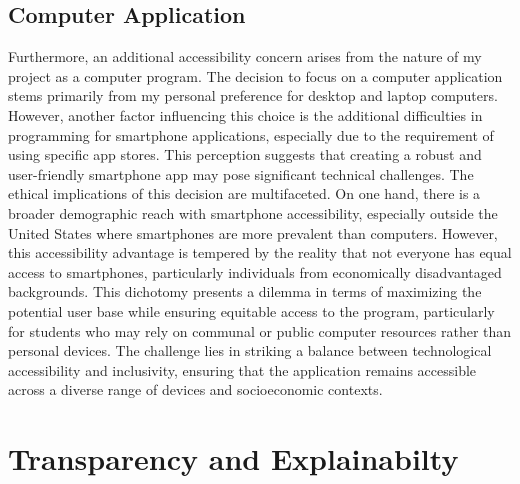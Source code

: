 \documentclass[10pt,twocolumn]{article}
\begin{document}
\subsection{Computer Application}
Furthermore, an additional accessibility concern arises from the nature of my project as a computer program. The decision to focus on a computer application stems primarily from my personal preference for desktop and laptop computers. However, another factor influencing this choice is the additional difficulties in programming for smartphone applications, especially due to the requirement of using specific app stores. This perception suggests that creating a robust and user-friendly smartphone app may pose significant technical challenges. The ethical implications of this decision are multifaceted. On one hand, there is a broader demographic reach with smartphone accessibility, especially outside the United States where smartphones are more prevalent than computers. However, this accessibility advantage is tempered by the reality that not everyone has equal access to smartphones, particularly individuals from economically disadvantaged backgrounds. This dichotomy presents a dilemma in terms of maximizing the potential user base while ensuring equitable access to the program, particularly for students who may rely on communal or public computer resources rather than personal devices. The challenge lies in striking a balance between technological accessibility and inclusivity, ensuring that the application remains accessible across a diverse range of devices and socioeconomic contexts.

\section{Transparency and Explainabilty}
\end{document}
